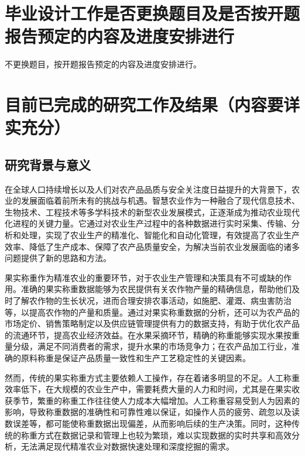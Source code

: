 \documentclass{xduugmr}
\begin{document}
\section{毕业设计工作是否更换题目及是否按开题报告预定的内容及进度安排进行}

不更换题目，按开题报告预定的内容及进度安排进行。

\section{目前已完成的研究工作及结果（内容要详实充分）}

\subsection{研究背景与意义}

在全球人口持续增长以及人们对农产品品质与安全关注度日益提升的大背景下，农业的发展面临着前所未有的挑战与机遇。智慧农业作为一种融合了现代信息技术、生物技术、工程技术等多学科技术的新型农业发展模式\cite{赵春江2021智慧农业的发展现状与未来展望}，正逐渐成为推动农业现代化进程的关键力量。它通过对农业生产过程中的各种数据进行实时采集、传输、分析和处理，实现了农业生产的精准化、智能化和自动化管理\cite{李道亮2012物联网与智慧农业}，有效提高了农业生产效率、降低了生产成本、保障了农产品质量安全，为解决当前农业发展面临的诸多问题提供了新的思路和方法。

果实称重作为精准农业的重要环节，对于农业生产管理和决策具有不可或缺的作用\cite{罗锡文2016信息技术提升农业机械化水平}。准确的果实称重数据能够为农民提供有关农作物产量的精确信息，帮助他们及时了解农作物的生长状况\cite{翁杨2019基于深度学习的农业植物表型研究综述}，进而合理安排农事活动，如施肥、灌溉、病虫害防治等，以提高农作物的产量和质量。通过对果实称重数据的分析，还可以为农产品的市场定价、销售策略制定以及供应链管理提供有力的数据支持，有助于优化农产品的流通环节，提高农业经济效益\cite{Lipcsei2021AnalysisOA}。在水果采摘环节，精确的称重能够实现水果按重量分级，满足不同消费者的需求，提升水果的市场竞争力\cite{Ji2019}；在农产品加工行业，准确的原料称重是保证产品质量一致性和生产工艺稳定性的关键因素。

然而，传统的果实称重方式主要依赖人工操作，存在着诸多明显的不足。人工称重效率低下，在大规模的农业生产中，需要耗费大量的人力和时间，尤其是在果实收获季节，繁重的称重工作往往使人力成本大幅增加\cite{Jiang2012}。人工称重容易受到人为因素的影响，导致称重数据的准确性和可靠性难以保证，如操作人员的疲劳、疏忽以及读数误差等，都可能使称重数据出现偏差，从而影响后续的生产决策\cite{Chen2002}。同时，这种传统的称重方式在数据记录和管理上也较为繁琐，难以实现数据的实时共享和高效分析，无法满足现代精准农业对数据快速处理和深度挖掘的需求\cite{Widagdo2020RecordingSO}。
\end{document}
